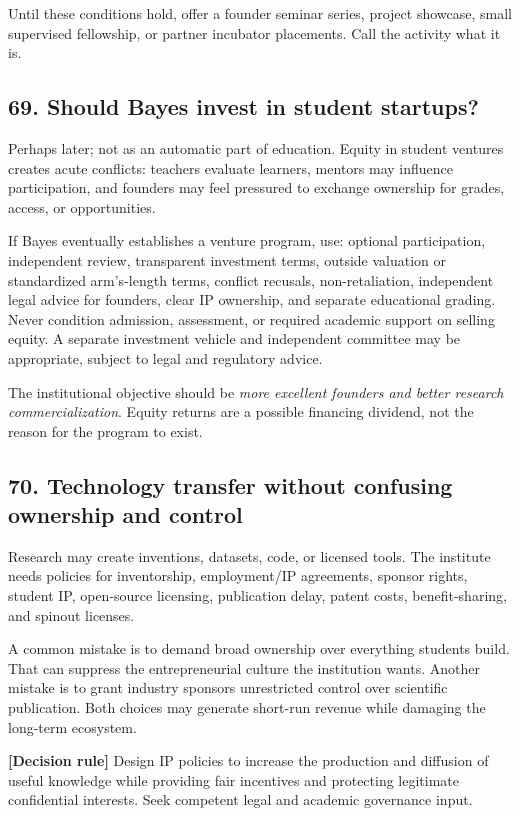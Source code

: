 Until these conditions hold, offer a founder seminar series, project showcase, small supervised fellowship, or partner incubator placements. Call the activity what it is.

\subsection{69. Should Bayes invest in student startups?}

Perhaps later; not as an automatic part of education. Equity in student ventures creates acute conflicts: teachers evaluate learners, mentors may influence participation, and founders may feel pressured to exchange ownership for grades, access, or opportunities.

If Bayes eventually establishes a venture program, use: optional participation, independent review, transparent investment terms, outside valuation or standardized arm's-length terms, conflict recusals, non-retaliation, independent legal advice for founders, clear IP ownership, and separate educational grading. Never condition admission, assessment, or required academic support on selling equity. A separate investment vehicle and independent committee may be appropriate, subject to legal and regulatory advice.

The institutional objective should be \textit{more excellent founders and better research commercialization}. Equity returns are a possible financing dividend, not the reason for the program to exist.

\subsection{70. Technology transfer without confusing ownership and control}

Research may create inventions, datasets, code, or licensed tools. The institute needs policies for inventorship, employment/\allowbreak IP agreements, sponsor rights, student IP, open-source licensing, publication delay, patent costs, benefit-sharing, and spinout licenses.

A common mistake is to demand broad ownership over everything students build. That can suppress the entrepreneurial culture the institution wants. Another mistake is to grant industry sponsors unrestricted control over scientific publication. Both choices may generate short-run revenue while damaging the long-term ecosystem.

\textbf{\textbf{[Decision rule]}} Design IP policies to increase the production and diffusion of useful knowledge while providing fair incentives and protecting legitimate confidential interests. Seek competent legal and academic governance input.

